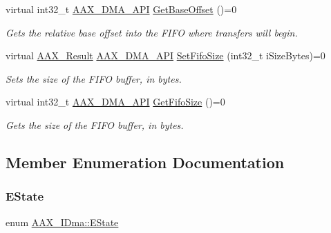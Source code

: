 \begin{Indent}
\begin{DoxyCompactItemize}
virtual int32\+\_\+t \mbox{\hyperlink{a00587_acae60d01e5e4bd3282369d0d9d378f3f}{A\+A\+X\+\_\+\+D\+M\+A\+\_\+\+A\+PI}} \mbox{\hyperlink{a01809_a1f6ce2d66bb6c26fa4e7e70821e8bd2d}{Get\+Base\+Offset}} ()=0
\begin{DoxyCompactList}\small\item\em Gets the relative base offset into the F\+I\+FO where transfers will begin. \end{DoxyCompactList}\item 
virtual \mbox{\hyperlink{a00392_a4d8f69a697df7f70c3a8e9b8ee130d2f}{A\+A\+X\+\_\+\+Result}} \mbox{\hyperlink{a00587_acae60d01e5e4bd3282369d0d9d378f3f}{A\+A\+X\+\_\+\+D\+M\+A\+\_\+\+A\+PI}} \mbox{\hyperlink{a01809_a98f731e4c7c60a3b6b969fd699448224}{Set\+Fifo\+Size}} (int32\+\_\+t i\+Size\+Bytes)=0
\begin{DoxyCompactList}\small\item\em Sets the size of the F\+I\+FO buffer, in bytes. \end{DoxyCompactList}\item 
virtual int32\+\_\+t \mbox{\hyperlink{a00587_acae60d01e5e4bd3282369d0d9d378f3f}{A\+A\+X\+\_\+\+D\+M\+A\+\_\+\+A\+PI}} \mbox{\hyperlink{a01809_aae573c01b6ecc918978f74881e87a761}{Get\+Fifo\+Size}} ()=0
\begin{DoxyCompactList}\small\item\em Gets the size of the F\+I\+FO buffer, in bytes. \end{DoxyCompactList}\end{DoxyCompactItemize}
\end{Indent}


\subsection{Member Enumeration Documentation}
\mbox{\label{a01809_a64e694fd40d32179e429eb7934a64842}} 
\subsubsection{\texorpdfstring{EState}{EState}}
{\footnotesize\ttfamily enum \mbox{\hyperlink{a01809_a64e694fd40d32179e429eb7934a64842}{A\+A\+X\+\_\+\+I\+Dma\+::\+E\+State}}}

